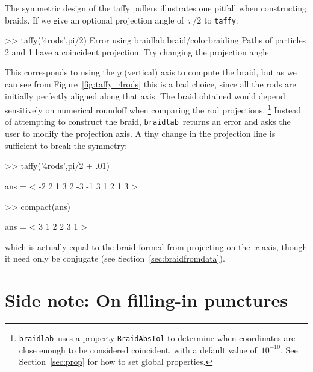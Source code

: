 \documentclass[12pt]{article}
\newcommand{\braidlab}{\texttt{braidlab}}%
\begin{document}
The symmetric design of the taffy pullers illustrates one pitfall when
constructing braids.  If we give an optional projection angle %
%
of~$\pi/2$ to \lstinline{taffy}:
\begin{lstbraidlab}
>> taffy('4rods',pi/2)
Error using braidlab.braid/colorbraiding
Paths of particles 2 and 1 have a coincident projection.
Try changing the projection angle.
\end{lstbraidlab}
This corresponds to using the $y$ (vertical) axis to compute the braid, but as
we can see from Figure~\ref{fig:taffy_4rods} this is a bad choice, since all
the rods are initially perfectly aligned along that axis.  The braid obtained
would depend sensitively on numerical roundoff when comparing the rod
projections.%
%
\footnote{\braidlab\ uses a property \lstinline{BraidAbsTol} to determine when
  coordinates are close enough to be considered coincident, with a default
  value of~$10^{-10}$.  See Section~\ref{sec:prop} for how to set global
  properties.}
%
Instead of attempting to construct the braid, \braidlab\ returns an error and
asks the user to modify the projection axis.  A tiny change in the projection
line is sufficient to break the symmetry:
\begin{lstbraidlab}
>> taffy('4rods',pi/2 + .01)

ans = < -2  2  1  3  2 -3 -1  3  1  2  1  3 >

>> compact(ans)

ans = < 3  1  2  2  3  1 >
\end{lstbraidlab}
%
which is actually equal to the braid formed from projecting on the~$x$ axis,
though it need only be conjugate %
%
(see Section~\ref{sec:braidfromdata}). %
%



\section{Side note: On filling-in punctures}

\end{document}

